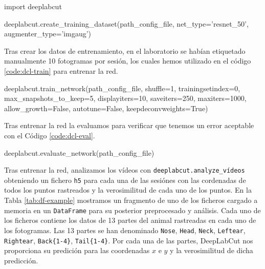 \begin{mypython}[caption={Crear datos de entrenamiento de DeepLabCut.}, label={code:dcl-dataset}]
import deeplabcut

deeplabcut.create_training_dataset(path_config_file, 
                                   net_type='resnet_50',
                                   augmenter_type='imgaug')
\end{mypython}

Tras crear los datos de entrenamiento, en el laboratorio se habían etiquetado manualmente 10 fotogramas por sesión, los cuales hemos utilizado en el código \ref{code:dcl-train} para entrenar la red.

\begin{mypython}[caption={Entrenar la red de DeepLabCut.}, label={code:dcl-train}]
deeplabcut.train_network(path_config_file,
                         shuffle=1,
                         trainingsetindex=0,
                         max_snapshots_to_keep=5,
                         displayiters=10,
                         saveiters=250,
                         maxiters=1000,
                         allow_growth=False,
                         autotune=False,
                         keepdeconvweights=True)
\end{mypython}

Tras entrenar la red la evaluamos para verificar que tenemos un error aceptable con el Código \ref{code:dcl-eval}.

\begin{mypython}[caption={Evaluar la red de DeepLabCut.}, label={code:dcl-eval}]
deeplabcut.evaluate_network(path_config_file)
\end{mypython}

Tras entrenar la red, analizamos los vídeos con \texttt{deeplabcut.analyze\_vídeos} obteniendo un fichero \texttt{h5} para cada una de las sesiónes con las cordenadas de todos los puntos rastreados y la verosimilitud de cada uno de los puntos. En la Tabla \ref{tab:df-example} mostramos un fragmento de uno de los ficheros cargado a memoria en un \texttt{DataFrame} para su posterior preprocesado y análisis. Cada uno de los ficheros contiene los datos de 13 partes del animal rastreadas en cada uno de los fotogramas. Las 13 partes se han denominado \texttt{Nose}, \texttt{Head}, \texttt{Neck}, \texttt{Leftear}, \texttt{Rightear}, \texttt{Back\{1-4\}}, \texttt{Tail\{1-4\}}. Por cada una de las partes, DeepLabCut nos proporciona su predición para las coordenadas $ x $ e $ y $ y la verosimilitud de dicha predicción.

